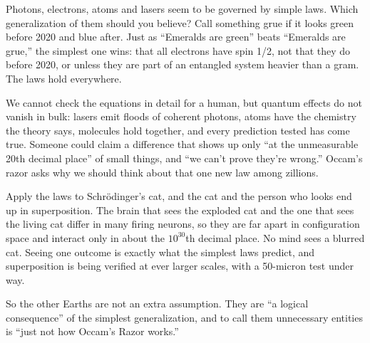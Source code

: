 
Photons, electrons, atoms and lasers seem to be governed by simple laws. Which generalization of them should you believe? Call something grue if it looks green before 2020 and blue after. Just as ``Emeralds are green'' beats ``Emeralds are grue,'' the simplest one wins: that all electrons have spin 1/2, not that they do before 2020, or unless they are part of an entangled system heavier than a gram. The laws hold everywhere. 

We cannot check the equations in detail for a human, but quantum effects do not vanish in bulk: lasers emit floods of coherent photons, atoms have the chemistry the theory says, molecules hold together, and every prediction tested has come true. Someone could claim a difference that shows up only ``at the unmeasurable 20th decimal place'' of small things, and ``we can't prove they're wrong.'' Occam's razor asks why we should think about that one new law among zillions.

Apply the laws to Schrödinger's cat, and the cat and the person who looks end up in superposition. The brain that sees the exploded cat and the one that sees the living cat differ in many firing neurons, so they are far apart in configuration space and interact only in about the $10^{30}$th decimal place. No mind sees a blurred cat. Seeing one outcome is exactly what the simplest laws predict, and superposition is being verified at ever larger scales, with a 50-micron test under way. 

So the other Earths are not an extra assumption. They are ``a logical consequence'' of the simplest generalization, and to call them unnecessary entities is ``just not how Occam's Razor works.'' 

